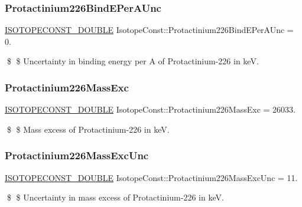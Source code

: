 \subsubsection{\texorpdfstring{Protactinium226\+Bind\+E\+Per\+A\+Unc}{Protactinium226BindEPerAUnc}}
{\footnotesize\ttfamily \mbox{\hyperlink{group___isotope_const-_macros_ga8f45a7272ce02c0b4c65c44636ed719a}{I\+S\+O\+T\+O\+P\+E\+C\+O\+N\+S\+T\+\_\+\+D\+O\+U\+B\+LE}} Isotope\+Const\+::\+Protactinium226\+Bind\+E\+Per\+A\+Unc = 0.}

\$ \$ Uncertainty in binding energy per A of Protactinium-\/226 in keV. \mbox{\label{group___isotope_const-_protactinium-_pa226_ga69846d509d0046d7c2878bca7c1f1347}} 
\subsubsection{\texorpdfstring{Protactinium226\+Mass\+Exc}{Protactinium226MassExc}}
{\footnotesize\ttfamily \mbox{\hyperlink{group___isotope_const-_macros_ga8f45a7272ce02c0b4c65c44636ed719a}{I\+S\+O\+T\+O\+P\+E\+C\+O\+N\+S\+T\+\_\+\+D\+O\+U\+B\+LE}} Isotope\+Const\+::\+Protactinium226\+Mass\+Exc = 26033.}

\$ \$ Mass excess of Protactinium-\/226 in keV. \mbox{\label{group___isotope_const-_protactinium-_pa226_ga1cd5c186b35633fd6e17ccd24431cd03}} 
\subsubsection{\texorpdfstring{Protactinium226\+Mass\+Exc\+Unc}{Protactinium226MassExcUnc}}
{\footnotesize\ttfamily \mbox{\hyperlink{group___isotope_const-_macros_ga8f45a7272ce02c0b4c65c44636ed719a}{I\+S\+O\+T\+O\+P\+E\+C\+O\+N\+S\+T\+\_\+\+D\+O\+U\+B\+LE}} Isotope\+Const\+::\+Protactinium226\+Mass\+Exc\+Unc = 11.}

\$ \$ Uncertainty in mass excess of Protactinium-\/226 in keV. \mbox{\label{group___isotope_const-_protactinium-_pa226_gaaaf31c17f94992b7975cbc33f43d773f}} 
